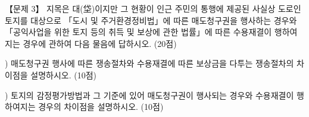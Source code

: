 \begin{longquestion}{【문제 3】}
지목은 대(垈)이지만 그 현황이 인근 주민의 통행에 제공된 사실상 도로인 토지를 대상으로 「도시 및 주거환경정비법」에 따른 매도청구권을 행사하는 경우와 「공익사업을 위한 토지 등의 취득 및 보상에 관한 법률」에 따른 수용재결이 행하여지는 경우에 관하여 다음 물음에 답하시오. (20점) \par
\medskip{}) 매도청구권 행사에 따른 쟁송절차와 수용재결에 따른 보상금을 다투는 쟁송절차의 차이점을 설명하시오. (10점) \par
\medskip{}) 토지의 감정평가방법과 그 기준에 있어 매도청구권이 행사되는 경우와 수용재결이 행하여지는 경우의 차이점을 설명하시오. (10점) \par
\end{longquestion}
